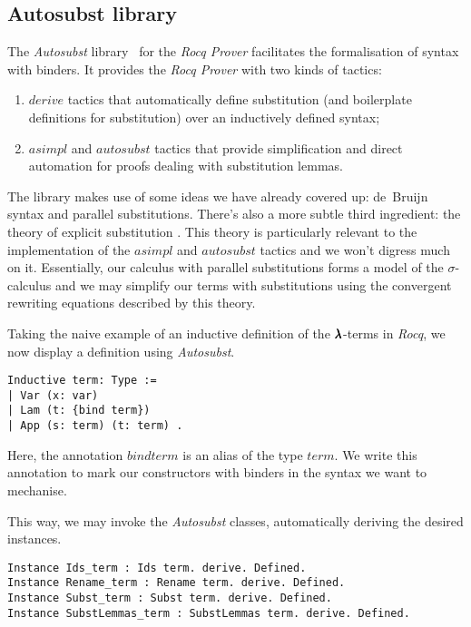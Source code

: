 \subsection{Autosubst library}

The \textit{Autosubst} library~\cite{AutosubstSchafer,AutosubstManual} for the \textit{Rocq Prover} facilitates the formalisation of syntax with binders.
It provides the \textit{Rocq Prover} with two kinds of tactics:
\begin{enumerate}
  \item \lst$derive$ tactics that automatically define substitution (and boilerplate definitions for substitution) over an inductively defined syntax;
  \item \lst$asimpl$ and \lst$autosubst$ tactics that provide simplification and direct automation for proofs dealing with substitution lemmas.
\end{enumerate}

The library makes use of some ideas we have already covered up: de~Bruijn syntax and parallel substitutions.
There's also a more subtle third ingredient: the theory of explicit substitution \cite{Abadi}.
This theory is particularly relevant to the implementation of the \lst$asimpl$ and \lst$autosubst$ tactics and we won't digress much on it.
Essentially, our calculus with parallel substitutions forms a model of the $\sigma$-calculus and we may simplify our terms with substitutions using the convergent rewriting equations described by this theory.

Taking the naive example of an inductive definition of the $\pmb{\lambda}$-terms in \textit{Rocq}, we now display a definition using \textit{Autosubst}.

\begin{lstlisting}[language=Coq]
Inductive term: Type :=
| Var (x: var)
| Lam (t: {bind term})
| App (s: term) (t: term) .
\end{lstlisting}

Here, the annotation \lst ${bind term}$ is an alias of the type \lst$term$.
We write this annotation to mark our constructors with binders in the syntax we want to mechanise.  

This way, we may invoke the \textit{Autosubst} classes, automatically deriving the desired instances.

\begin{lstlisting}[language=Coq]
Instance Ids_term : Ids term. derive. Defined.
Instance Rename_term : Rename term. derive. Defined.
Instance Subst_term : Subst term. derive. Defined.
Instance SubstLemmas_term : SubstLemmas term. derive. Defined.
\end{lstlisting}


